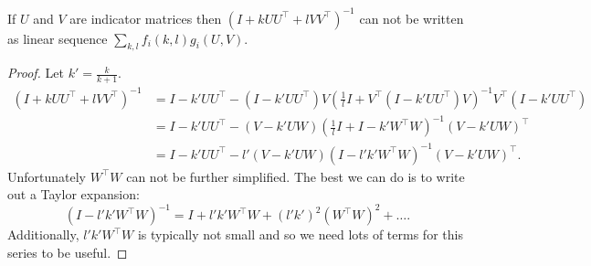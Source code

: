 \begin{lemma}
  If $U$ and $V$ are indicator matrices then ${(I + k UU^\top + l VV^\top)}^{-1}$ can not be written as linear sequence $\sum_{k,l} f_i(k,l) g_i(U, V)$.
\end{lemma}
\begin{proof}
  Let $k' = \frac{k}{k+1}$.
  \begin{align*}
    {(I + k U U^\top + l VV^\top)}^{-1}
    &= I - k' U U^\top - (I - k' U U^\top) V (\frac{1}{l} I + V^\top (I - k' U U^\top) V)^{-1} V^\top (I - k' U U^\top) \\
    &= I - k' U U^\top - (V - k' U W) (\frac{1}{l} I + I - k' W^\top W)^{-1} (V - k' U W)^\top \\ 
    &= I - k' U U^\top - l' (V - k' U W) (I - l' k' W^\top W)^{-1} (V - k' U W)^\top.
  \end{align*}
  Unfortunately $W^\top W$ can not be further simplified. The best we can do is to write out a Taylor expansion:
  \[
  (I - l' k' W^\top W)^{-1} = 
  I + l' k' W^\top W + (l' k')^2 (W^\top W)^2 + \ldots.
  \]
  Additionally, $l' k' W^\top W$ is typically not small and so we need lots of terms for this series to be useful.
\end{proof}
